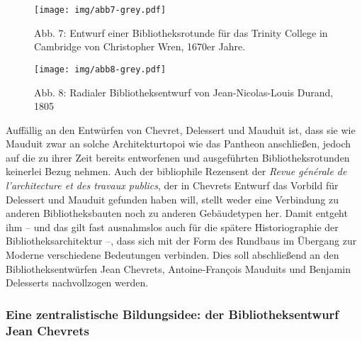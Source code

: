 \begin{figure}[htbp]
\centering
\texttt{[image: img/abb7-grey.pdf]}
\caption*{Abb. 7: Entwurf einer Bibliotheksrotunde für das Trinity
College in Cambridge von Christopher Wren, 1670er Jahre.}
\end{figure}

\begin{figure}[htbp]
\centering
\texttt{[image: img/abb8-grey.pdf]}
\caption*{Abb. 8: Radialer Bibliotheksentwurf von Jean-Nicolas-Louis
Durand, 1805}
\end{figure}

Auffällig an den Entwürfen von Chevret, Delessert und Mauduit ist, dass
sie wie Mauduit zwar an solche Architekturtopoi wie das Pantheon
anschließen, jedoch auf die zu ihrer Zeit bereits entworfenen und
ausgeführten Bibliotheksrotunden keinerlei Bezug nehmen. Auch der
bibliophile Rezensent der \emph{Revue générale de l'architecture et des
travaux publics}, der in Chevrets Entwurf das Vorbild für Delessert und
Mauduit gefunden haben will, stellt weder eine Verbindung zu anderen
Bibliotheksbauten noch zu anderen Gebäudetypen her. Damit entgeht ihm --
und das gilt fast ausnahmslos auch für die spätere Historiographie der
Bibliotheksarchitektur --, dass sich mit der Form des Rundbaus im
Übergang zur Moderne verschiedene Bedeutungen verbinden. Dies soll
abschließend an den Bibliotheksentwürfen Jean Chevrets, Antoine-François
Mauduits und Benjamin Delesserts nachvollzogen werden.

\subsubsection{Eine zentralistische Bildungsidee: der Bibliotheksentwurf
Jean
Chevrets}\label{eine-zentralistische-bildungsidee-der-bibliotheksentwurf-jean-chevrets}

